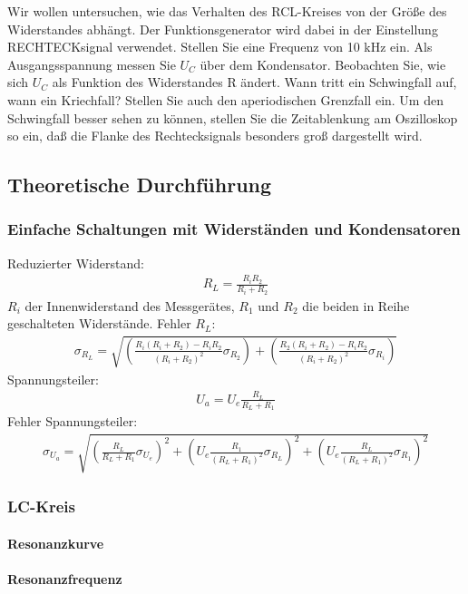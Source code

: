 \documentclass[12pt]{scrartcl}
\begin{document}
Wir wollen untersuchen, wie das Verhalten des RCL-Kreises von der Größe des Widerstandes abhängt. Der Funktionsgenerator wird dabei in der Einstellung RECHTECKsignal verwendet. Stellen Sie eine Frequenz von 10 kHz ein. Als Ausgangsspannung messen Sie
$U_C$ über dem Kondensator. Beobachten Sie, wie sich $U_C$
als Funktion des Widerstandes
R ändert. Wann tritt ein Schwingfall auf, wann ein Kriechfall? Stellen Sie auch den
aperiodischen Grenzfall ein. Um den Schwingfall besser sehen zu können, stellen Sie die Zeitablenkung am Oszilloskop so ein, daß die Flanke des Rechtecksignals besonders groß dargestellt wird.
\subsection{Theoretische Durchführung}
\subsubsection{Einfache Schaltungen mit Widerständen und Kondensatoren}
Reduzierter Widerstand:
\begin{align}
R_L = \frac{R_i R_2}{R_i + R_2}
\end{align}
$R_i$ der Innenwiderstand des Messgerätes,
$R_1$ und $R_2$ die beiden in Reihe geschalteten Widerstände.
Fehler $R_L$:
\begin{align}
\sigma_{R_L} = \sqrt{
\left(\frac{R_i(R_i+R_2)-R_i R_2}{(R_i + R_2)^2}\sigma_{R_2}\right)+
\left(\frac{R_2(R_i+R_2)-R_i R_2}{(R_i + R_2)^2}\sigma_{R_i}\right)}
\end{align}
Spannungsteiler:
\begin{align}
U_a = U_e \frac{R_L}{R_L + R_1}
\end{align}
Fehler Spannungsteiler:
\begin{align}
\sigma_{U_a} = \sqrt{
\left(\frac{R_L}{R_L + R_1}\sigma_{U_e}\right)^2+
\left(U_e \frac{R_1}{(R_L + R_1)^2}\sigma_{R_L}\right)^2+
\left(U_e \frac{R_L}{(R_L + R_1)^2}\sigma_{R_1}\right)^2}
\end{align}
\subsubsection{LC-Kreis}
\paragraph{Resonanzkurve}
\paragraph{Resonanzfrequenz}
\end{document}
